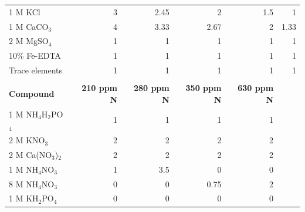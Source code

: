 \begin{table}[!h]
{\begin{tabular}{p{4cm}p{2cm}p{2cm}p{2cm}p{2cm}p{2cm}}
        1 M KCl                 & \multicolumn{1}{r}{3}         & \multicolumn{1}{r}{2.45}      & \multicolumn{1}{r}{2}         & \multicolumn{1}{r}{1.5}       & \multicolumn{1}{r}{1}    \\
        1 M CaCO$_3$            & \multicolumn{1}{r}{4}         & \multicolumn{1}{r}{3.33}      & \multicolumn{1}{r}{2.67}      & \multicolumn{1}{r}{2}         & \multicolumn{1}{r}{1.33} \\
        2 M MgSO$_4$            & \multicolumn{1}{r}{1}         & \multicolumn{1}{r}{1}         & \multicolumn{1}{r}{1}         & \multicolumn{1}{r}{1}         & \multicolumn{1}{r}{1}    \\
        10\% Fe-EDTA            & \multicolumn{1}{r}{1}         & \multicolumn{1}{r}{1}         & \multicolumn{1}{r}{1}         & \multicolumn{1}{r}{1}         & \multicolumn{1}{r}{1}    \\
        Trace elements          & \multicolumn{1}{r}{1}         & \multicolumn{1}{r}{1}         & \multicolumn{1}{r}{1}         & \multicolumn{1}{r}{1}         & \multicolumn{1}{r}{1}    \\
        \hline
        &&&&&
        \\
        \hline
        \textbf{Compound}
        & \multicolumn{1}{r}{\textbf{210 ppm N}}
        & \multicolumn{1}{r}{\textbf{280 ppm N}}
        & \multicolumn{1}{r}{\textbf{350 ppm N}}
        & \multicolumn{1}{r}{\textbf{630 ppm N}} &
        \\
        \hline
        1 M NH$_4$H$_2$PO$_4$   & \multicolumn{1}{r}{1}         & \multicolumn{1}{r}{1}         & \multicolumn{1}{r}{1}         & \multicolumn{1}{r}{1}         &   \\
        2 M KNO$_3$             & \multicolumn{1}{r}{2}         & \multicolumn{1}{r}{2}         & \multicolumn{1}{r}{2}         & \multicolumn{1}{r}{2}         &   \\
        2 M Ca(NO$_3$)$_2$      & \multicolumn{1}{r}{2}         & \multicolumn{1}{r}{2}         & \multicolumn{1}{r}{2}         & \multicolumn{1}{r}{2}         &   \\
        1 M NH$_4$NO$_3$        & \multicolumn{1}{r}{1}         & \multicolumn{1}{r}{3.5}       & \multicolumn{1}{r}{0}         & \multicolumn{1}{r}{0}         &   \\
        8 M NH$_4$NO$_3$        & \multicolumn{1}{r}{0}         & \multicolumn{1}{r}{0}         & \multicolumn{1}{r}{0.75}      & \multicolumn{1}{r}{2}         &   \\
        1 M KH$_2$PO$_4$        & \multicolumn{1}{r}{0}         & \multicolumn{1}{r}{0}         & \multicolumn{1}{r}{0}         & \multicolumn{1}{r}{0}         &   \\

\end{tabular}}
\end{table}
